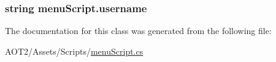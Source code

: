 \subsubsection[{username}]{\setlength{\rightskip}{0pt plus 5cm}string menu\+Script.\+username\hspace{0.3cm}{\ttfamily [static]}}\label{classmenu_script_ac884cc3a06860162c4fc9b4672753bc9}


The documentation for this class was generated from the following file\+:\begin{DoxyCompactItemize}
\item 
A\+O\+T2/\+Assets/\+Scripts/\hyperlink{menu_script_8cs}{menu\+Script.\+cs}\end{DoxyCompactItemize}
